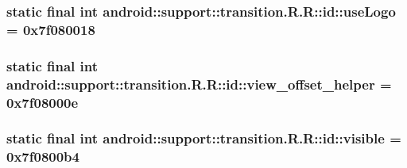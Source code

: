 \hypertarget{classandroid_1_1support_1_1transition_1_1_r_1_1id_8b9dca98a992911a2965950becdac0e3}{
\subsubsection[{useLogo}]{\setlength{\rightskip}{0pt plus 5cm}static final int android::support::transition.R.R::id::useLogo = 0x7f080018}}
\label{classandroid_1_1support_1_1transition_1_1_r_1_1id_8b9dca98a992911a2965950becdac0e3}


\hypertarget{classandroid_1_1support_1_1transition_1_1_r_1_1id_0d577c5d19ad3f5bc32f92c97c4c6f4c}{
\subsubsection[{view\_\-offset\_\-helper}]{\setlength{\rightskip}{0pt plus 5cm}static final int android::support::transition.R.R::id::view\_\-offset\_\-helper = 0x7f08000e}}
\label{classandroid_1_1support_1_1transition_1_1_r_1_1id_0d577c5d19ad3f5bc32f92c97c4c6f4c}


\hypertarget{classandroid_1_1support_1_1transition_1_1_r_1_1id_510363633f6d9593d016412a5bf1ca49}{
\subsubsection[{visible}]{\setlength{\rightskip}{0pt plus 5cm}static final int android::support::transition.R.R::id::visible = 0x7f0800b4}}
\label{classandroid_1_1support_1_1transition_1_1_r_1_1id_510363633f6d9593d016412a5bf1ca49}


